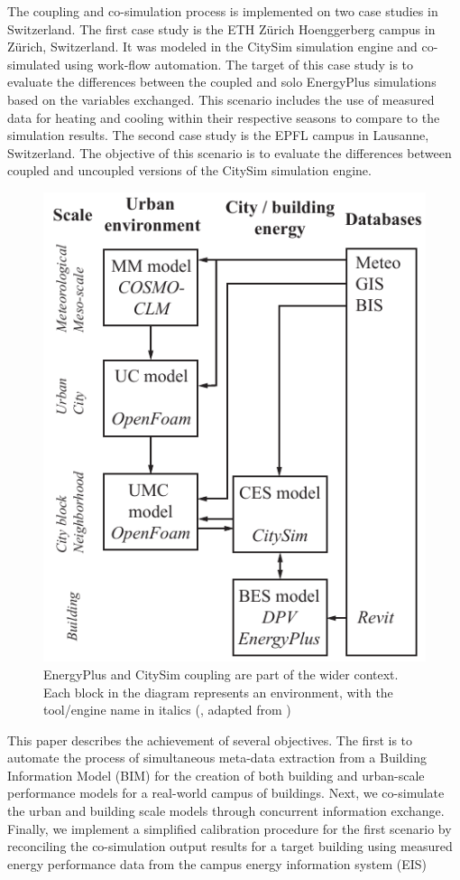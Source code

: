 \documentclass{tBPS2e}
\theoremstyle{plain}
\theoremstyle{definition}
\theoremstyle{remark}
\begin{document}
The coupling and co-simulation process is implemented on two case studies in
Switzerland. The first case study is the ETH Z\"urich Hoenggerberg campus in
Z\"urich, Switzerland. It was modeled in the CitySim simulation engine
and co-simulated using work-flow automation. The target of this case study is
to evaluate the differences between the coupled and solo EnergyPlus
simulations based on the variables exchanged. This scenario includes the use
of measured data for heating and cooling within their respective seasons to
compare to the simulation results. The second case study is the EPFL campus in
Lausanne, Switzerland. The objective of this scenario is to evaluate the
differences between coupled and uncoupled versions of the CitySim simulation
engine.

\begin{figure}[H]
\centering
\includegraphics[scale=0.7]{figures/UMEM_overview_new}
\caption{EnergyPlus and CitySim coupling are part of the wider context. Each
block in the diagram represents an environment, with the tool/engine name in
italics (\citep{thomas_multiscale_2014}, adapted from \citep{dorer_modelling_2013})}
\label{fig:UMEM}
\end{figure}

This paper describes the achievement of several objectives. The first is to
automate the process of simultaneous meta-data extraction from a
Building Information Model (BIM) for the creation of both building and
urban-scale performance models for a real-world campus of buildings. Next, we co-simulate 
the urban and building scale models through concurrent information exchange.
Finally, we implement a simplified calibration procedure for the first scenario by 
reconciling the co-simulation output results for a target building using measured energy 
performance data from the campus energy information system (EIS)
\end{document}
